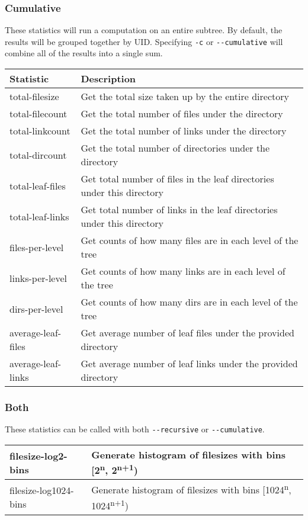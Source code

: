 \subsubsection{Cumulative}
These statistics will run a computation on an entire subtree. By
default, the results will be grouped together by UID. Specifying
\texttt{-c} or \texttt{-{}-cumulative} will combine all of the results
into a single sum.
\\
\begin{table}[h!]
  \begin{tabular} {| l | l |}
    \hline
    Statistic & Description \\
    \hline
    total-filesize & Get the total size taken up by the entire directory
    \\
    \hline
    total-filecount & Get the total number of files under the directory \\
    \hline
    total-linkcount & Get the total number of links under the directory \\
    \hline
    total-dircount & Get the total number of directories under the
    directory \\
    \hline
    total-leaf-files & Get total number of files in the leaf directories
    under this directory \\
    \hline
    total-leaf-links & Get total number of links in the leaf directories
    under this directory \\
    \hline
    files-per-level & Get counts of how many files are in each level of
    the tree \\
    \hline
    links-per-level & Get counts of how many links are in each level of
    the tree \\
    \hline
    dirs-per-level & Get counts of how many dirs are in each level of the
    tree \\
    \hline
    average-leaf-files & Get average number of leaf files under the
    provided directory \\
    \hline
    average-leaf-links & Get average number of leaf links under the
    provided directory \\
    \hline
  \end{tabular}
\end{table}

\subsubsection{Both}
These statistics can be called with both \texttt{-{}-recursive} or
\texttt{-{}-cumulative}.
\\
\begin{table}[h!]
  \begin{tabular} {| l | l |}
    \hline
    filesize-log2-bins & Generate histogram of filesizes with bins
    [2\textsuperscript{n}, 2\textsuperscript{n+1}) \\
    \hline
    filesize-log1024-bins & Generate histogram of filesizes with bins
    [1024\textsuperscript{n}, 1024\textsuperscript{n+1}) \\
    \hline
  \end{tabular}
\end{table}

